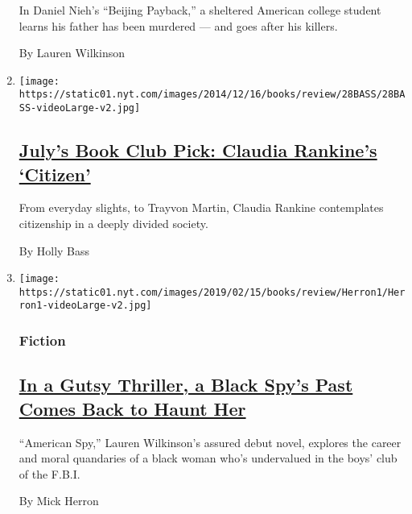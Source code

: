 \begin{enumerate}
  In Daniel Nieh's ``Beijing Payback,'' a sheltered American college
  student learns his father has been murdered --- and goes after his
  killers.

  By Lauren Wilkinson
\item
  \texttt{[image: https://static01.nyt.com/images/2014/12/16/books/review/28BASS/28BASS-videoLarge-v2.jpg]}

  \hypertarget{julys-book-club-pick-claudia-rankines-citizen}{%
  \subsection{\texorpdfstring{\href{/2014/12/28/books/review/claudia-rankines-citizen.html}{July's
  Book Club Pick: Claudia Rankine's
  `Citizen'}}{July's Book Club Pick: Claudia Rankine's `Citizen'}}\label{julys-book-club-pick-claudia-rankines-citizen}}

  From everyday slights, to Trayvon Martin, Claudia Rankine contemplates
  citizenship in a deeply divided society.

  By Holly Bass
\item
  \texttt{[image: https://static01.nyt.com/images/2019/02/15/books/review/Herron1/Herron1-videoLarge-v2.jpg]}

  \hypertarget{fiction}{%
  \subsubsection{Fiction}\label{fiction}}

  \hypertarget{in-a-gutsy-thriller-a-black-spys-past-comes-back-to-haunt-her}{%
  \subsection{\texorpdfstring{\href{/2019/02/20/books/review/american-spy-lauren-wilkinson.html}{In
  a Gutsy Thriller, a Black Spy's Past Comes Back to Haunt
  Her}}{In a Gutsy Thriller, a Black Spy's Past Comes Back to Haunt Her}}\label{in-a-gutsy-thriller-a-black-spys-past-comes-back-to-haunt-her}}

  ``American Spy,'' Lauren Wilkinson's assured debut novel, explores the
  career and moral quandaries of a black woman who's undervalued in the
  boys' club of the F.B.I.

  By Mick Herron
\end{enumerate}

